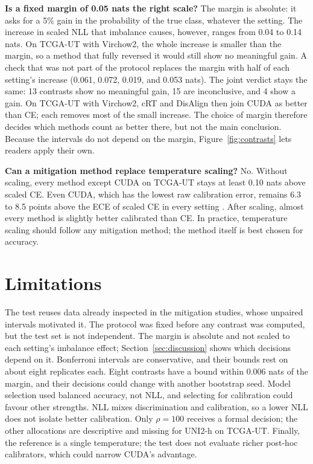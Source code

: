 \documentclass[11pt]{article}
\begin{document}
\smallskip\noindent\textbf{Is a fixed margin of 0.05 nats the right scale?} The margin is absolute: it asks for a 5\% gain in the probability of the true class, whatever the setting. The increase in scaled NLL that imbalance causes, however, ranges from 0.04 to 0.14 nats. On TCGA-UT with Virchow2, the whole increase is smaller than the margin, so a method that fully reversed it would still show no meaningful gain. A check that was not part of the protocol replaces the margin with half of each setting's increase (0.061, 0.072, 0.019, and 0.053 nats). The joint verdict stays the same: 13 contrasts show no meaningful gain, 15 are inconclusive, and 4 show a gain. On TCGA-UT with Virchow2, cRT and DisAlign then join CUDA as better than CE; each removes most of the small increase. The choice of margin therefore decides which methods count as better there, but not the main conclusion. Because the intervals do not depend on the margin, Figure~\ref{fig:contrasts} lets readers apply their own.

\smallskip\noindent\textbf{Can a mitigation method replace temperature scaling?} No. Without scaling, every method except CUDA on TCGA-UT stays at least 0.10 nats above scaled CE. Even CUDA, which has the lowest raw calibration error, remains 6.3 to 8.5 points above the ECE of scaled CE in every setting \citep{queisler2026mitigationBracs,queisler2026mitigationUni2h,queisler2026mitigationTcga,queisler2026mitigationTcgaUni2h}. After scaling, almost every method is slightly better calibrated than CE. In practice, temperature scaling should follow any mitigation method; the method itself is best chosen for accuracy.

\section{Limitations}
\label{sec:limitations}
The test reuses data already inspected in the mitigation studies, whose unpaired intervals motivated it. The protocol was fixed before any contrast was computed, but the test set is not independent. The margin is absolute and not scaled to each setting's imbalance effect; Section~\ref{sec:discussion} shows which decisions depend on it. Bonferroni intervals are conservative, and their bounds rest on about eight replicates each. Eight contrasts have a bound within 0.006 nats of the margin, and their decisions could change with another bootstrap seed. Model selection used balanced accuracy, not NLL, and selecting for calibration could favour other strengths. NLL mixes discrimination and calibration, so a lower NLL does not isolate better calibration. Only $\rho=100$ receives a formal decision; the other allocations are descriptive and missing for UNI2-h on TCGA-UT. Finally, the reference is a single temperature; the test does not evaluate richer post-hoc calibrators, which could narrow CUDA's advantage.



\end{document}
